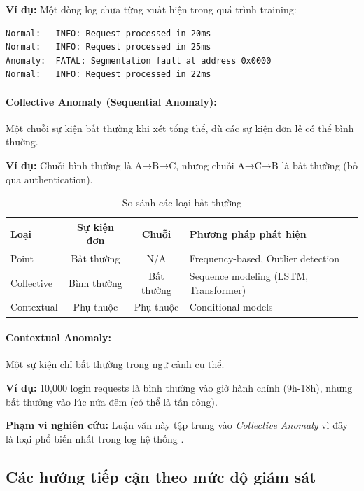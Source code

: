 \textbf{Ví dụ:} Một dòng log chưa từng xuất hiện trong quá trình training:
\begin{verbatim}
Normal:   INFO: Request processed in 20ms
Normal:   INFO: Request processed in 25ms
Anomaly:  FATAL: Segmentation fault at address 0x0000
Normal:   INFO: Request processed in 22ms
\end{verbatim}

\paragraph{Collective Anomaly (Sequential Anomaly):} Một chuỗi sự kiện bất thường khi xét tổng thể, dù các sự kiện đơn lẻ có thể bình thường.

\textbf{Ví dụ:} Chuỗi bình thường là A→B→C, nhưng chuỗi A→C→B là bất thường (bỏ qua authentication).

\begin{table}[ht]
\centering
\caption{So sánh các loại bất thường}
\label{tab:anomaly-types}
\begin{tabular}{lccl}
\hline
\textbf{Loại} & \textbf{Sự kiện đơn} & \textbf{Chuỗi} & \textbf{Phương pháp phát hiện} \\
\hline
Point & Bất thường & N/A & Frequency-based, Outlier detection \\
Collective & Bình thường & Bất thường & Sequence modeling (LSTM, Transformer) \\
Contextual & Phụ thuộc & Phụ thuộc & Conditional models \\
\hline
\end{tabular}
\end{table}

\paragraph{Contextual Anomaly:} Một sự kiện chỉ bất thường trong ngữ cảnh cụ thể.

\textbf{Ví dụ:} 10,000 login requests là bình thường vào giờ hành chính (9h-18h), nhưng bất thường vào lúc nửa đêm (có thể là tấn công).

\textbf{Phạm vi nghiên cứu:} Luận văn này tập trung vào \textit{Collective Anomaly} vì đây là loại phổ biến nhất trong log hệ thống \cite{he2020loghub}.

\subsection{Các hướng tiếp cận theo mức độ giám sát}
\label{subsec:supervision-approaches}

